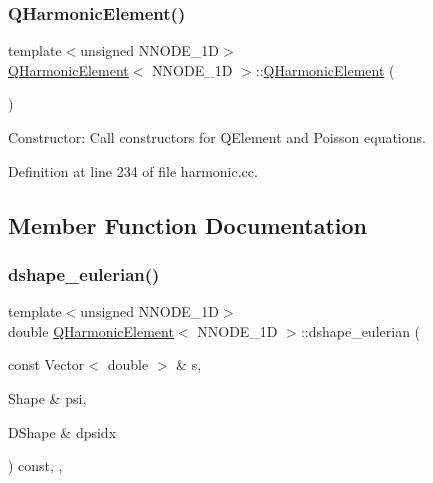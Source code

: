 \subsubsection{\texorpdfstring{Q\+Harmonic\+Element()}{QHarmonicElement()}}
{\footnotesize\ttfamily template$<$unsigned N\+N\+O\+D\+E\+\_\+1D$>$ \\
\hyperlink{classQHarmonicElement}{Q\+Harmonic\+Element}$<$ N\+N\+O\+D\+E\+\_\+1D $>$\+::\hyperlink{classQHarmonicElement}{Q\+Harmonic\+Element} (\begin{DoxyParamCaption}{ }\end{DoxyParamCaption})\hspace{0.3cm}{\ttfamily [inline]}}



Constructor\+: Call constructors for Q\+Element and Poisson equations. 



Definition at line 234 of file harmonic.\+cc.



\subsection{Member Function Documentation}
\mbox{\label{classQHarmonicElement_a206b7334e82cb563d7d575deb9f755b1}} 
\subsubsection{\texorpdfstring{dshape\+\_\+eulerian()}{dshape\_eulerian()}}
{\footnotesize\ttfamily template$<$unsigned N\+N\+O\+D\+E\+\_\+1D$>$ \\
double \hyperlink{classQHarmonicElement}{Q\+Harmonic\+Element}$<$ N\+N\+O\+D\+E\+\_\+1D $>$\+::dshape\+\_\+eulerian (\begin{DoxyParamCaption}\item[{const Vector$<$ double $>$ \&}]{s,  }\item[{Shape \&}]{psi,  }\item[{D\+Shape \&}]{dpsidx }\end{DoxyParamCaption}) const\hspace{0.3cm}{\ttfamily [inline]}, {\ttfamily [protected]}, {\ttfamily [virtual]}}




